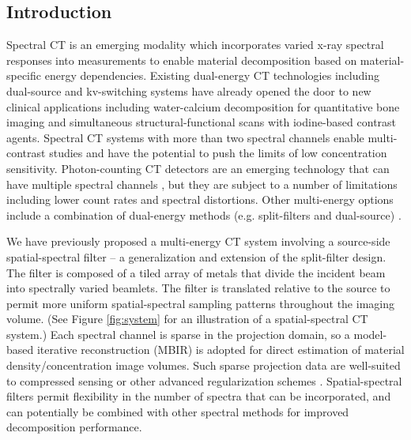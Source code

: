 \documentclass[12pt]{spieman}  %
\begin{document}
\begin{spacing}{1}   %

\vspace{-4mm}

\section{Introduction}

\vspace{-2mm}

Spectral CT is an emerging modality which incorporates varied x-ray spectral responses into measurements to enable material decomposition based on material-specific energy dependencies. Existing dual-energy CT technologies including dual-source and kv-switching systems have already opened the door to new clinical applications including water-calcium decomposition for quantitative bone imaging and simultaneous structural-functional scans with iodine-based contrast agents.\cite{mccollough2015dual} Spectral CT systems with more than two spectral channels enable multi-contrast studies and have the potential to push the limits of low concentration sensitivity. Photon-counting CT detectors are an emerging technology that can have multiple spectral channels \cite{symons2017photon}, but they are subject to a number of limitations including lower count rates and spectral distortions. Other multi-energy options include a combination of dual-energy methods (e.g. split-filters and dual-source) \cite{primak2009improved}.

We have previously proposed a multi-energy CT system involving a source-side spatial-spectral filter \cite{stayman2018model} \cite{tivnan2019physical} \--- a generalization and extension of the split-filter design. The filter is composed of a tiled array of metals that divide the incident beam into spectrally varied beamlets. The filter is translated relative to the source to permit more uniform spatial-spectral sampling patterns throughout the imaging volume. (See Figure \ref{fig:system} for an illustration of a spatial-spectral CT system.) %
Each spectral channel is sparse in the projection domain, so a model-based iterative reconstruction (MBIR) is adopted for direct estimation of material density/concentration image volumes. Such sparse projection data are well-suited to compressed sensing or other advanced regularization schemes \cite{bian2010evaluation} \cite{koesters2017sparsect}.  Spatial-spectral filters permit flexibility in the number of spectra that can be incorporated, and can potentially be combined with other spectral methods for improved decomposition performance. 


\end{spacing}
\end{document}
